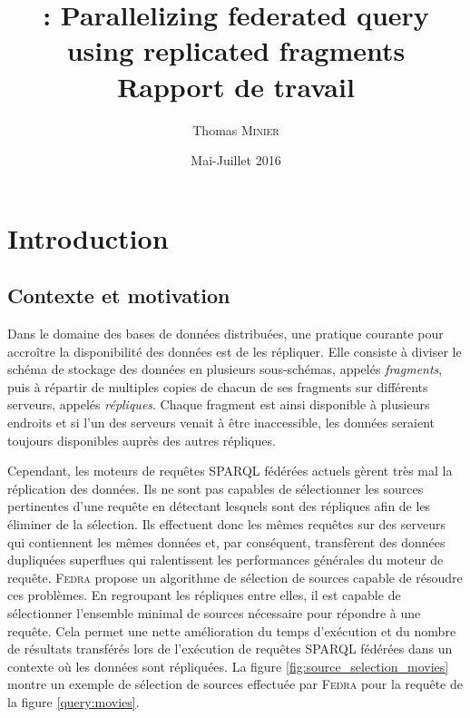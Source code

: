 \documentclass[a4paper]{article}
\title{\peneloop : Parallelizing federated \sparql query using replicated fragments\\Rapport de travail}
\author{Thomas \textsc{Minier}}
\date{Mai-Juillet 2016}
\def\sparql{\textsc{SPARQL}\xspace}
\def\fedra{\textsc{Fedra}\xspace}
\begin{document}
\maketitle

\tableofcontents

\newpage

\section{Introduction}

\subsection{Contexte et motivation}

Dans le domaine des bases de données distribuées, une pratique courante pour accroître la disponibilité des données est de les répliquer. Elle consiste à diviser le schéma de stockage des données en plusieurs sous-schémas, appelés \textit{fragments}, puis à répartir de multiples copies de chacun de ses fragments sur différents serveurs, appelés \textit{répliques}. Chaque fragment est ainsi disponible à plusieurs endroits et si l'un des serveurs venait à être inaccessible, les données seraient toujours disponibles auprès des autres répliques.

Cependant, les moteurs de requêtes \sparql fédérées actuels \cite{schwarte2011fedx,acosta2011anapsid} gèrent très mal la réplication des données. Ils ne sont pas capables de sélectionner les sources pertinentes d'une requête en détectant lesquels sont des répliques afin de les éliminer de la sélection. Ils effectuent donc les mêmes requêtes sur des serveurs qui contiennent les mêmes données et, par conséquent, transfèrent des données dupliquées superflues qui ralentissent les performances générales du moteur de requête. \fedra \cite{montoya2014fedra} propose un algorithme de sélection de sources capable de résoudre ces problèmes. En regroupant les répliques entre elles, il est capable de sélectionner l'ensemble minimal de sources nécessaire pour répondre à une requête. Cela permet une nette amélioration du temps d'exécution et du nombre de résultats transférés lors de l'exécution de requêtes \sparql fédérées dans un contexte où les données sont répliquées. La figure \ref{fig:source_selection_movies} montre un exemple de sélection de sources effectuée par \fedra pour la requête de la figure \ref{query:movies}.


\end{document}
